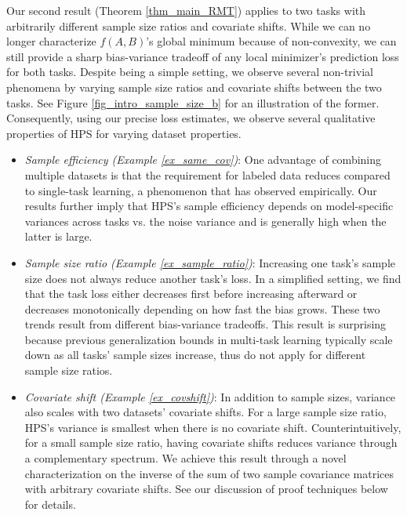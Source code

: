 Our second result (Theorem \ref{thm_main_RMT}) applies to two tasks with arbitrarily different sample size ratios and covariate shifts.
While we can no longer characterize $f(A, B)$'s global minimum because of non-convexity, we can still provide a sharp bias-variance tradeoff of any local minimizer's prediction loss for both tasks.
Despite being a simple setting, we observe several non-trivial phenomena by varying sample size ratios and covariate shifts between the two tasks.
See Figure \ref{fig_intro_sample_size_b} for an illustration of the former.
Consequently, using our precise loss estimates, we observe several qualitative properties of HPS for varying dataset properties.
\begin{itemize}
	\item \textit{Sample efficiency (Example \ref{ex_same_cov})}:
	One advantage of combining multiple datasets is that the requirement for labeled data reduces compared to single-task learning, a phenomenon that \cite{ZSSGM18} has observed empirically.
	Our results further imply that HPS's sample efficiency depends on model-specific variances across tasks vs. the noise variance and is generally high when the latter is large.

	\item \textit{Sample size ratio (Example \ref{ex_sample_ratio})}: Increasing one task's sample size does not always reduce another task's loss. In a simplified setting, we find that the task loss either decreases first before increasing afterward or decreases monotonically depending on how fast the bias grows. These two trends result from different bias-variance tradeoffs. This result is surprising because previous generalization bounds in multi-task learning typically scale down as all tasks' sample sizes increase, thus do not apply for different sample size ratios.

	\item \textit{Covariate shift (Example \ref{ex_covshift})}: In addition to sample sizes, variance also scales with two datasets' covariate shifts. For a large sample size ratio, HPS's  variance is smallest when there is no covariate shift. Counterintuitively, for a small sample size ratio, having covariate shifts reduces variance through a complementary spectrum. We achieve this result through a novel characterization on the inverse of the sum of two sample covariance matrices with arbitrary covariate shifts. See our discussion of proof techniques below for details.
\end{itemize}


